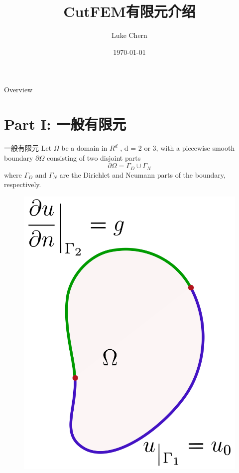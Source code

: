 \documentclass[lang=en,aspectratio=43,theme=default,logo=on]{simplebeamer}
\title{CutFEM有限元介绍}
\author{Luke Chern}
\institute{西安工程大学（机电工程学院）}
\date{\today}
\begin{document}
\maketitle

\begin{frame}{Overview}
	\tableofcontents
\end{frame}

\section{Part I: 一般有限元}

\begin{frame}{一般有限元}
	Let $\Omega$ be a domain in $R^d$ , d = 2 or 3, with a piecewise smooth boundary $\partial \Omega$ consisting
	of two disjoint parts
	\begin{equation*}
		\partial \Omega =\Gamma_D \cup \Gamma_N
	\end{equation*}
	where $\Gamma_D$ and $\Gamma_N$ are the Dirichlet and Neumann parts of the boundary, respectively.
	\begin{figure}
		\centering
		\includegraphics[height=0.4\textheight]{./img/Mixed_boundary_conditions.png}
	\end{figure}
\end{frame}
\end{document}
